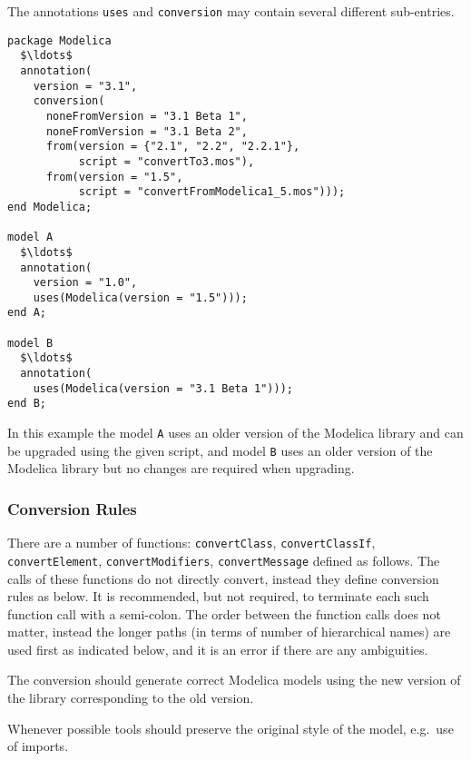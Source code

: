 The annotations \lstinline!uses! and \lstinline!conversion! may contain several different sub-entries.

\begin{example}
\begin{lstlisting}[language=modelica]
package Modelica
  $\ldots$
  annotation(
    version = "3.1",
    conversion(
      noneFromVersion = "3.1 Beta 1",
      noneFromVersion = "3.1 Beta 2",
      from(version = {"2.1", "2.2", "2.2.1"},
           script = "convertTo3.mos"),
      from(version = "1.5",
           script = "convertFromModelica1_5.mos")));
end Modelica;

model A
  $\ldots$
  annotation(
    version = "1.0",
    uses(Modelica(version = "1.5")));
end A;

model B
  $\ldots$
  annotation(
    uses(Modelica(version = "3.1 Beta 1")));
end B;
\end{lstlisting}
In this example the model \lstinline!A! uses an older version of the Modelica library and can be upgraded using the given script, and model \lstinline!B! uses an older version of the Modelica library but no changes are required when upgrading.
\end{example}

\subsubsection{Conversion Rules}\label{conversion-rules}

There are a number of functions: \lstinline!convertClass!, \lstinline!convertClassIf!,
\lstinline!convertElement!, \mbox{\lstinline!convertModifiers!,} \lstinline!convertMessage! defined as follows. The
calls of these functions do not directly convert, instead they define
conversion rules as below.
It is recommended, but not required, to terminate each such function call with a semi-colon.
The order between the function calls does not matter, instead the longer paths (in terms of number of hierarchical names)
are used first as indicated below, and it is an error if there are any
ambiguities.

The conversion should generate correct Modelica models using the new version of the library
corresponding to the old version.

\begin{nonnormative}
Whenever possible tools should preserve the original style of the model, e.g.\ use of imports.
\end{nonnormative}

